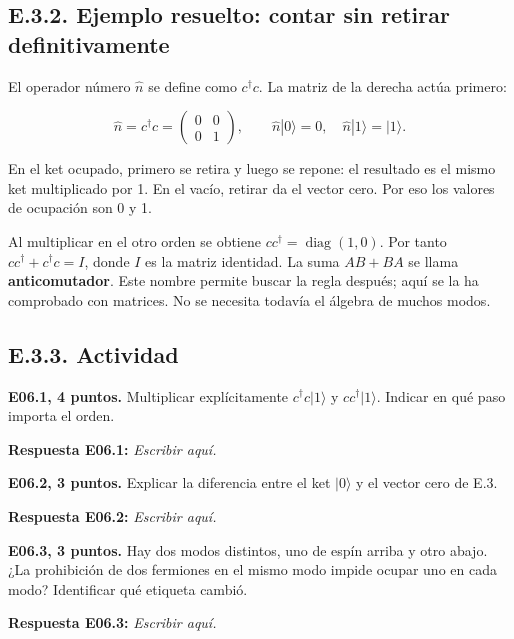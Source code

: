 \documentclass[
  spanish,
  10pt,
  a4paper,
]{article}
\begin{document}
\subsection{E.3.2. Ejemplo resuelto: contar sin retirar
definitivamente}\label{e.3.2.-ejemplo-resuelto-contar-sin-retirar-definitivamente}

El operador número \(\hat n\) se define como \(c^\dagger c\). La matriz
de la derecha actúa primero:

\[
\hat n=c^\dagger c=\begin{pmatrix}0&0\\0&1\end{pmatrix},
\qquad \hat n|0\rangle=0,\quad \hat n|1\rangle=|1\rangle.
\tag{E.4}
\]

En el ket ocupado, primero se retira y luego se repone: el resultado es
el mismo ket multiplicado por 1. En el vacío, retirar da el vector cero.
Por eso los valores de ocupación son 0 y 1.

Al multiplicar en el otro orden se obtiene
\(cc^\dagger=\operatorname{diag}(1,0)\). Por tanto
\(cc^\dagger+c^\dagger c=I\), donde \(I\) es la matriz identidad. La
suma \(AB+BA\) se llama \textbf{anticomutador}. Este nombre permite
buscar la regla después; aquí se la ha comprobado con matrices. No se
necesita todavía el álgebra de muchos modos.

\subsection{E.3.3. Actividad}\label{e.3.3.-actividad}


\textbf{E06.1, 4 puntos.} Multiplicar explícitamente
\(c^\dagger c|1\rangle\) y \(cc^\dagger|1\rangle\). Indicar en qué paso
importa el orden.

\textbf{Respuesta E06.1:} \emph{Escribir aquí.}


\textbf{E06.2, 3 puntos.} Explicar la diferencia entre el ket
\(|0\rangle\) y el vector cero de E.3.

\textbf{Respuesta E06.2:} \emph{Escribir aquí.}


\textbf{E06.3, 3 puntos.} Hay dos modos distintos, uno de espín arriba y
otro abajo. ¿La prohibición de dos fermiones en el mismo modo impide
ocupar uno en cada modo? Identificar qué etiqueta cambió.

\textbf{Respuesta E06.3:} \emph{Escribir aquí.}
\end{document}
